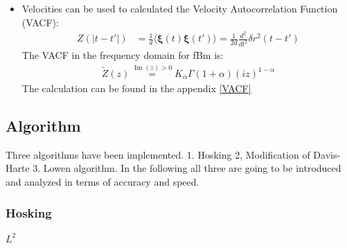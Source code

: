 \documentclass[
  a4paper,BCOR10mm,oneside,
  bibtotoc,idxtotoc,
  headsepline,footsepline,%
  fleqn,openbib
]{scrbook}
\begin{document}
\begin{itemize} 
\item Velocities can be used to calculated the Velocity Autocorrelation Function (VACF):
\begin{align}
Z(|t-t'|)&= \frac{1}{d}\langle \bm{\xi}(t) \bm{\xi}(t') \rangle = \frac{1}{2d} \frac{d^2}{dt^2} \delta r^2 (t-t')  
\end{align}
The VACF in the frequency domain for fBm is: 
\begin{align}
  \tilde{Z}(z) \stackrel{\operatorname{Im}(z)> 0} {=}  K_{\alpha} \Gamma(1+\alpha)(i z)^{1-\alpha}
\end{align}
The calculation can be found in the appendix \ref{VACF}
\end{itemize}
\subsection{Algorithm}
Three algorithms have been implemented. 
1. Hosking 2, Modification of Davis-Harte 3. Lowen algorithm. In the following all three are going to be introduced and analyzed in terms of accuracy and speed. 
\subsubsection{Hosking}



$L^2$
\end{document}
